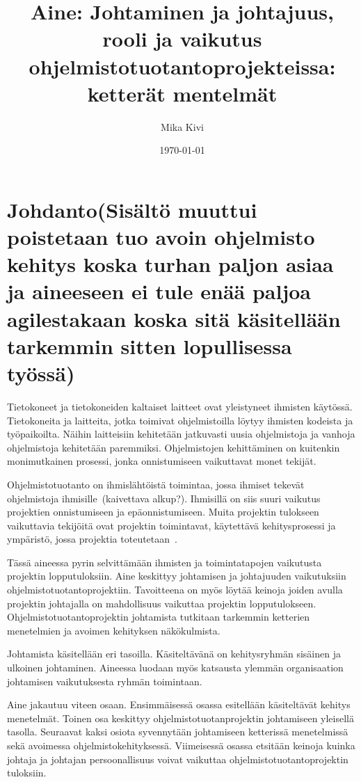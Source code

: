 \documentclass[finnish]{tktltiki2}
\title{Aine: Johtaminen ja johtajuus, rooli ja vaikutus ohjelmistotuotantoprojekteissa: ketterät mentelmät}
\author{Mika Kivi}
\date{\today}
\theoremstyle{definition}
\theoremstyle{remark}
\begin{document}

\maketitle        %
\makeabstract     %

\tableofcontents  %
\newpage          %



\section{Johdanto(Sisältö muuttui poistetaan tuo avoin ohjelmisto kehitys koska turhan paljon asiaa ja aineeseen ei tule enää paljoa agilestakaan koska sitä käsitellään tarkemmin sitten lopullisessa työssä)}

Tietokoneet ja tietokoneiden kaltaiset laitteet ovat yleistyneet ihmisten käytössä. Tietokoneita ja laitteita, jotka toimivat ohjelmistoilla löytyy ihmisten kodeista ja työpaikoilta. Näihin laitteisiin kehitetään jatkuvasti uusia ohjelmistoja ja vanhoja ohjelmistoja kehitetään paremmiksi. Ohjelmistojen kehittäminen on kuitenkin monimutkainen prosessi, jonka onnistumiseen vaikuttavat monet tekijät.

Ohjelmistotuotanto on ihmislähtöistä toimintaa, jossa ihmiset tekevät ohjelmistoja ihmisille~\cite{Wang:2010:PPP:1810295.1810302}(kaivettava alkup?). Ihmisillä on siis suuri vaikutus projektien onnistumiseen ja epäonnistumiseen. Muita projektin tulokseen vaikuttavia tekijöitä ovat projektin toimintavat, käytettävä kehitysprosessi ja ympäristö, jossa projektia toteutetaan~\cite{McLeod:2011:FAS:1978802.1978803}. 


Tässä aineessa pyrin selvittämään ihmisten ja toimintatapojen vaikutusta projektin lopputuloksiin. Aine keskittyy johtamisen ja johtajuuden vaikutuksiin ohjelmistotuotantoprojektiin. Tavoitteena on myös löytää keinoja joiden avulla projektin johtajalla on mahdollisuus vaikuttaa projektin lopputulokseen. Ohjelmistotuotantoprojektin johtamista tutkitaan tarkemmin ketterien menetelmien ja avoimen kehityksen näkökulmista.

Johtamista käsitellään eri tasoilla. Käsiteltävänä on kehitysryhmän sisäinen ja ulkoinen johtaminen. Aineessa luodaan myös katsausta ylemmän organisaation johtamisen vaikutuksesta ryhmän toimintaan. 

Aine jakautuu viteen osaan. Ensimmäisessä osassa esitellään käsiteltävät kehitys menetelmät. Toinen osa keskittyy ohjelmistotuotanprojektin johtamiseen yleisellä tasolla. Seuraavat kaksi osiota syvennytään johtamiseen ketterissä menetelmissä sekä avoimessa ohjelmistokehityksessä. Viimeisessä osassa etsitään keinoja kuinka johtaja ja johtajan persoonallisuus voivat vaikuttaa ohjelmistotuotantoprojektin tuloksiin.
  
\end{document}
